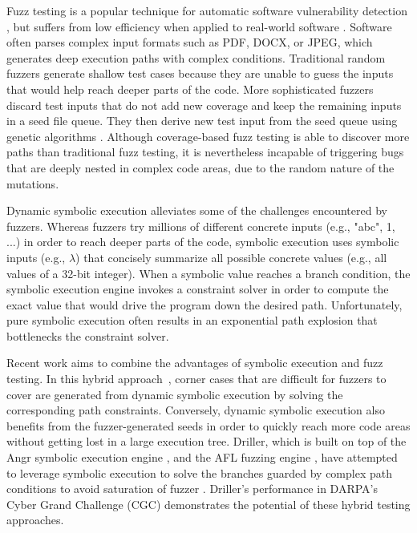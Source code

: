 Fuzz testing is a popular technique for automatic software
vulnerability detection \cite{Miller:Fuzz, 5010257, sutton2007fuzzing},
but suffers from low efficiency when applied to real-world software
\cite{neystadt2008automated, godefroid2008automating, ganesh2009taint,
cadar2011symbolic, rawat2017vuzzer, stephens2016driller}. Software
often parses complex input formats such as PDF, DOCX, or JPEG, which
generates deep execution paths with complex conditions. Traditional
random fuzzers generate shallow test cases because they are unable to
guess the inputs that would help reach deeper parts of the code. More
sophisticated fuzzers discard test inputs that do not add new coverage
and keep the remaining inputs in a seed file queue. They then derive
new test input from the seed queue using genetic algorithms
\cite{rawat2017vuzzer, online:afl, stephens2016driller}. Although
coverage-based fuzz testing is able to discover more paths than
traditional fuzz testing, it is nevertheless incapable of triggering
bugs that are deeply nested in complex code areas, due to the random
nature of the mutations.

Dynamic symbolic execution alleviates some of the challenges
encountered by fuzzers. Whereas fuzzers try millions of different
concrete inputs (e.g., "abc", 1, ...) in order to reach deeper parts of
the code, symbolic execution uses symbolic inputs (e.g., $\lambda$)
that concisely summarize all possible concrete values (e.g., all values
of a 32-bit integer). When a symbolic value reaches a branch condition,
the symbolic execution engine invokes a constraint solver in order to
compute the exact value that would drive the program down the desired
path. Unfortunately, pure symbolic execution often results in an
exponential path explosion that bottlenecks the constraint solver.

Recent work aims to combine the advantages of symbolic execution and
fuzz testing. In this hybrid approach~\cite{godefroid2012sage,
yeh2015craxfuzz, majumdar2007hybrid, pak2012hybrid}, corner cases that
are difficult for fuzzers to cover are generated from dynamic symbolic
execution by solving the corresponding path constraints. Conversely,
dynamic symbolic execution also benefits from the fuzzer-generated
seeds in order to quickly reach more code areas without getting lost in
a large execution tree. Driller, which is built on top of the Angr
symbolic execution engine \cite{Shoshitaishvili_firmalice-automatic},
and the AFL fuzzing engine \cite{online:afl}, have attempted to
leverage symbolic execution to solve the branches guarded by complex
path conditions to avoid saturation of fuzzer
\cite{stephens2016driller}. Driller's performance in DARPA's Cyber
Grand Challenge (CGC) \cite{online:CGC} demonstrates the potential of
these hybrid testing approaches.


